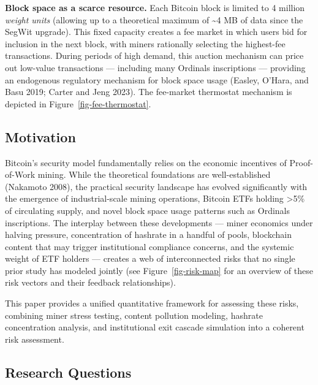 \documentclass[
  11pt,
]{article}
\let\oldsubsection\subsection
\renewcommand{\subsection}[1]{\FloatBarrier\oldsubsection{#1}}
\begin{document}
\textbf{Block space as a scarce resource.} Each Bitcoin block is limited
to 4 million \emph{weight units} (allowing up to a theoretical maximum
of \textasciitilde4 MB of data since the SegWit upgrade). This fixed
capacity creates a fee market in which users bid for inclusion in the
next block, with miners rationally selecting the highest-fee
transactions. During periods of high demand, this auction mechanism can
price out low-value transactions --- including many Ordinals
inscriptions --- providing an endogenous regulatory mechanism for block
space usage (Easley, O'Hara, and Basu 2019; Carter and Jeng 2023). The
fee-market thermostat mechanism is depicted in
Figure~\ref{fig-fee-thermostat}.

\hypertarget{motivation}{%
\subsection{Motivation}\label{motivation}}

Bitcoin's security model fundamentally relies on the economic incentives
of Proof-of-Work mining. While the theoretical foundations are
well-established (Nakamoto 2008), the practical security landscape has
evolved significantly with the emergence of industrial-scale mining
operations, Bitcoin ETFs holding \textgreater5\% of circulating supply,
and novel block space usage patterns such as Ordinals inscriptions. The
interplay between these developments --- miner economics under halving
pressure, concentration of hashrate in a handful of pools, blockchain
content that may trigger institutional compliance concerns, and the
systemic weight of ETF holders --- creates a web of interconnected risks
that no single prior study has modeled jointly (see
Figure~\ref{fig-risk-map} for an overview of these risk vectors and
their feedback relationships).

This paper provides a unified quantitative framework for assessing these
risks, combining miner stress testing, content pollution modeling,
hashrate concentration analysis, and institutional exit cascade
simulation into a coherent risk assessment.

\hypertarget{research-questions}{%
\subsection{Research Questions}\label{research-questions}}
\end{document}
